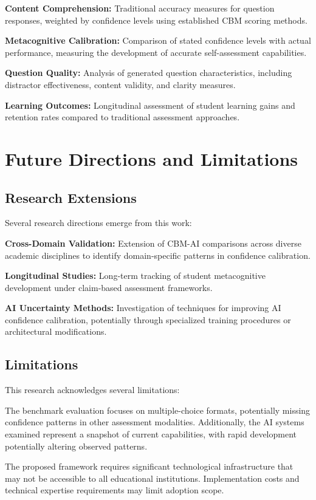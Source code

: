 \documentclass[sigconf]{acmart}
\begin{document}
\textbf{Content Comprehension:} Traditional accuracy measures for question responses, weighted by confidence levels using established CBM scoring methods.

\textbf{Metacognitive Calibration:} Comparison of stated confidence levels with actual performance, measuring the development of accurate self-assessment capabilities.

\textbf{Question Quality:} Analysis of generated question characteristics, including distractor effectiveness, content validity, and clarity measures.

\textbf{Learning Outcomes:} Longitudinal assessment of student learning gains and retention rates compared to traditional assessment approaches.

\section{Future Directions and Limitations}

\subsection{Research Extensions}

Several research directions emerge from this work:

\textbf{Cross-Domain Validation:} Extension of CBM-AI comparisons across diverse academic disciplines to identify domain-specific patterns in confidence calibration.

\textbf{Longitudinal Studies:} Long-term tracking of student metacognitive development under claim-based assessment frameworks.

\textbf{AI Uncertainty Methods:} Investigation of techniques for improving AI confidence calibration, potentially through specialized training procedures or architectural modifications.

\subsection{Limitations}

This research acknowledges several limitations:

The benchmark evaluation focuses on multiple-choice formats, potentially missing confidence patterns in other assessment modalities. Additionally, the AI systems examined represent a snapshot of current capabilities, with rapid development potentially altering observed patterns.

The proposed framework requires significant technological infrastructure that may not be accessible to all educational institutions. Implementation costs and technical expertise requirements may limit adoption scope.
\end{document}
